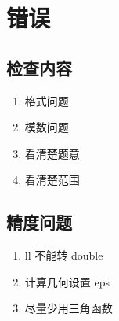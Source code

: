 \chapter{错误}

\section{检查内容}

\begin{enumerate}
    \item 格式问题
    \item 模数问题
    \item 看清楚题意
    \item 看清楚范围
\end{enumerate}

\section{精度问题}

\begin{enumerate}
    \item ll 不能转 double
    \item 计算几何设置 eps
    \item 尽量少用三角函数
\end{enumerate}